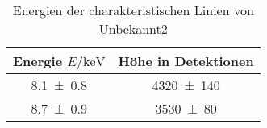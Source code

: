 
\begin{table}[H]
    \centering
    \caption{Energien der charakteristischen Linien von Unbekannt2}
    \label{tab:label}
    \begin{tabular}{c|c}
       Energie $E/\unit{\kilo\electronvolt}$ & Höhe in Detektionen \\
\hline
\num{8.1\pm 0.8} & \num{4320\pm 140} \\ 
\num{8.7\pm 0.9} & \num{3530\pm 80} \\ 

    \end{tabular}
\end{table}